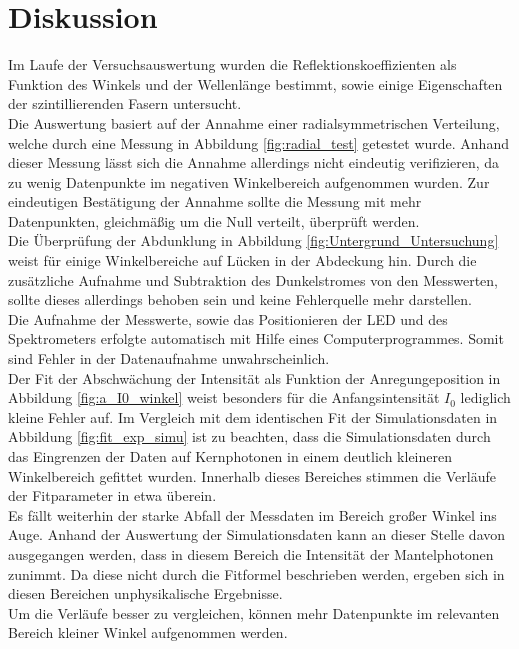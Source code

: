 \section{Diskussion}
Im Laufe der Versuchsauswertung wurden die Reflektionskoeffizienten als Funktion des Winkels und der Wellenlänge bestimmt, sowie einige Eigenschaften der szintillierenden Fasern untersucht.\\

Die Auswertung basiert auf der Annahme einer radialsymmetrischen Verteilung, welche durch eine Messung in Abbildung \ref{fig:radial_test} getestet wurde. Anhand dieser Messung lässt sich die Annahme allerdings nicht eindeutig verifizieren, da zu wenig Datenpunkte im negativen Winkelbereich aufgenommen wurden. Zur eindeutigen Bestätigung der Annahme sollte die Messung mit mehr Datenpunkten, gleichmäßig um die Null verteilt, überprüft werden.\\

Die Überprüfung der Abdunklung in Abbildung \ref{fig:Untergrund_Untersuchung} weist für einige Winkelbereiche auf Lücken in der Abdeckung hin. Durch die zusätzliche Aufnahme und Subtraktion des Dunkelstromes von den Messwerten, sollte dieses allerdings behoben sein und keine Fehlerquelle mehr darstellen.\\

Die Aufnahme der Messwerte, sowie das Positionieren der LED und des Spektrometers erfolgte automatisch mit Hilfe eines Computerprogrammes. Somit sind Fehler in der Datenaufnahme unwahrscheinlich.\\

Der Fit der Abschwächung der Intensität als Funktion der Anregungeposition in Abbildung \ref{fig:a_I0_winkel} weist besonders für die Anfangsintensität $I_0$ lediglich kleine Fehler auf. Im Vergleich mit dem identischen Fit der Simulationsdaten in Abbildung \ref{fig:fit_exp_simu} ist zu beachten, dass die Simulationsdaten durch das Eingrenzen der Daten auf Kernphotonen in einem deutlich kleineren Winkelbereich gefittet wurden. Innerhalb dieses Bereiches stimmen die Verläufe der Fitparameter in etwa überein.\\
Es fällt weiterhin der starke Abfall der Messdaten im Bereich großer Winkel ins Auge. Anhand der Auswertung der Simulationsdaten kann an dieser Stelle davon ausgegangen werden, dass in diesem Bereich die Intensität der Mantelphotonen zunimmt. Da diese nicht durch die Fitformel beschrieben werden, ergeben sich in diesen Bereichen unphysikalische Ergebnisse.\\
Um die Verläufe besser zu vergleichen, können mehr Datenpunkte im relevanten Bereich kleiner Winkel aufgenommen werden.\\

